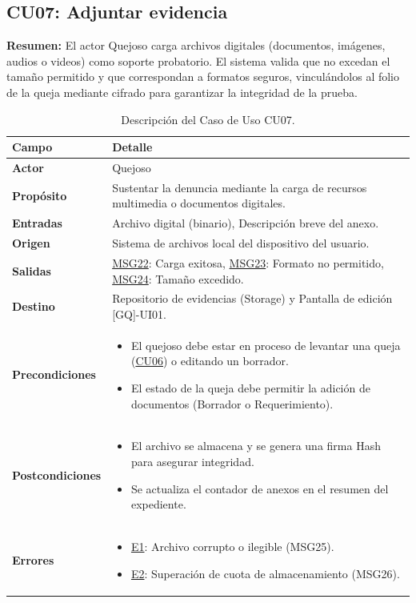\begin{appendices}
\subsection{CU07: Adjuntar evidencia}

\textbf{Resumen:} 
El actor Quejoso carga archivos digitales (documentos, imágenes, audios o videos) como soporte probatorio. El sistema valida que no excedan el tamaño permitido y que correspondan a formatos seguros, vinculándolos al folio de la queja mediante cifrado para garantizar la integridad de la prueba.

\begin{table}[htbp]
\centering
\small
\begin{tabular}{|p{3.5cm}|p{10.5cm}|}
\hline
\rowcolor[HTML]{EFEFEF} 
\textbf{Campo} & \textbf{Detalle} \\ \hline
\textbf{Actor} & Quejoso \\ \hline
\textbf{Propósito} & Sustentar la denuncia mediante la carga de recursos multimedia o documentos digitales. \\ \hline
\textbf{Entradas} & Archivo digital (binario), Descripción breve del anexo. \\ \hline
\textbf{Origen} & Sistema de archivos local del dispositivo del usuario. \\ \hline
\textbf{Salidas} & \hyperlink{msg:MSG22}{MSG22}: Carga exitosa, \hyperlink{msg:MSG23}{MSG23}: Formato no permitido, \hyperlink{msg:MSG24}{MSG24}: Tamaño excedido. \\ \hline
\textbf{Destino} & Repositorio de evidencias (Storage) y Pantalla de edición [GQ]-UI01. \\ \hline
\textbf{Precondiciones} & 
\begin{itemize}[nosep, leftmargin=*]
    \item El quejoso debe estar en proceso de levantar una queja (\hyperlink{anexo:casos_uso}{CU06}) o editando un borrador.
    \item El estado de la queja debe permitir la adición de documentos (Borrador o Requerimiento).
\end{itemize} \\ \hline
\textbf{Postcondiciones} & 
\begin{itemize}[nosep, leftmargin=*]
    \item El archivo se almacena y se genera una firma Hash para asegurar integridad.
    \item Se actualiza el contador de anexos en el resumen del expediente.
\end{itemize} \\ \hline
\textbf{Errores} & 
\begin{itemize}[nosep, leftmargin=*]
    \item \hyperlink{err:E12}{E1}: Archivo corrupto o ilegible (MSG25).
    \item \hyperlink{err:E13}{E2}: Superación de cuota de almacenamiento (MSG26).
\end{itemize} \\ \hline
\end{tabular}
\caption{Descripción del Caso de Uso CU07.}
\label{tab:cu07_especificacion}
\end{table}


\end{appendices}
